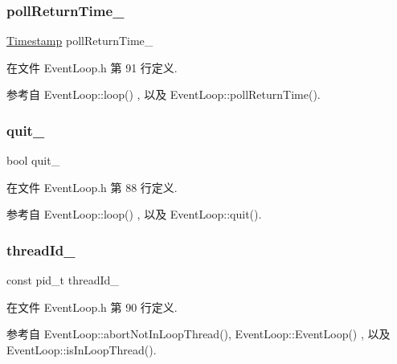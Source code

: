 \subsubsection{\texorpdfstring{poll\+Return\+Time\+\_\+}{pollReturnTime\_}}
{\footnotesize\ttfamily \hyperlink{classmuduo_1_1Timestamp}{Timestamp} poll\+Return\+Time\+\_\+\hspace{0.3cm}{\ttfamily [private]}}



在文件 Event\+Loop.\+h 第 91 行定义.



参考自 Event\+Loop\+::loop() , 以及 Event\+Loop\+::poll\+Return\+Time().

\mbox{\label{classmuduo_1_1EventLoop_ad03d5e60173eec4928f28be29b5cbacf}} 
\subsubsection{\texorpdfstring{quit\+\_\+}{quit\_}}
{\footnotesize\ttfamily bool quit\+\_\+\hspace{0.3cm}{\ttfamily [private]}}



在文件 Event\+Loop.\+h 第 88 行定义.



参考自 Event\+Loop\+::loop() , 以及 Event\+Loop\+::quit().

\mbox{\label{classmuduo_1_1EventLoop_a34adb5b3e132d9207ceed3440b4f2ab1}} 
\subsubsection{\texorpdfstring{thread\+Id\+\_\+}{threadId\_}}
{\footnotesize\ttfamily const pid\+\_\+t thread\+Id\+\_\+\hspace{0.3cm}{\ttfamily [private]}}



在文件 Event\+Loop.\+h 第 90 行定义.



参考自 Event\+Loop\+::abort\+Not\+In\+Loop\+Thread(), Event\+Loop\+::\+Event\+Loop() , 以及 Event\+Loop\+::is\+In\+Loop\+Thread().

